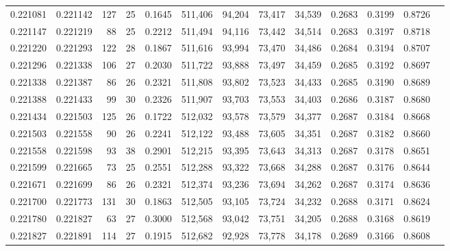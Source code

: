\begin{tabular}{rrrrrrrrrrrrr}
0.221081 & 0.221142 & 127 &  25 &                                     0.1645 & 511,406 &  94,204 &  73,417 &  34,539 & 0.2683 & 0.3199 & 0.8726 \\
0.221147 & 0.221219 &  88 &  25 &                                     0.2212 & 511,494 &  94,116 &  73,442 &  34,514 & 0.2683 & 0.3197 & 0.8718 \\
0.221220 & 0.221293 & 122 &  28 &                                     0.1867 & 511,616 &  93,994 &  73,470 &  34,486 & 0.2684 & 0.3194 & 0.8707 \\
0.221296 & 0.221338 & 106 &  27 &                                     0.2030 & 511,722 &  93,888 &  73,497 &  34,459 & 0.2685 & 0.3192 & 0.8697 \\
0.221338 & 0.221387 &  86 &  26 &                                     0.2321 & 511,808 &  93,802 &  73,523 &  34,433 & 0.2685 & 0.3190 & 0.8689 \\
0.221388 & 0.221433 &  99 &  30 &                                     0.2326 & 511,907 &  93,703 &  73,553 &  34,403 & 0.2686 & 0.3187 & 0.8680 \\
0.221434 & 0.221503 & 125 &  26 &                                     0.1722 & 512,032 &  93,578 &  73,579 &  34,377 & 0.2687 & 0.3184 & 0.8668 \\
0.221503 & 0.221558 &  90 &  26 &                                     0.2241 & 512,122 &  93,488 &  73,605 &  34,351 & 0.2687 & 0.3182 & 0.8660 \\
0.221558 & 0.221598 &  93 &  38 &                                     0.2901 & 512,215 &  93,395 &  73,643 &  34,313 & 0.2687 & 0.3178 & 0.8651 \\
0.221599 & 0.221665 &  73 &  25 &                                     0.2551 & 512,288 &  93,322 &  73,668 &  34,288 & 0.2687 & 0.3176 & 0.8644 \\
0.221671 & 0.221699 &  86 &  26 &                                     0.2321 & 512,374 &  93,236 &  73,694 &  34,262 & 0.2687 & 0.3174 & 0.8636 \\
0.221700 & 0.221773 & 131 &  30 &                                     0.1863 & 512,505 &  93,105 &  73,724 &  34,232 & 0.2688 & 0.3171 & 0.8624 \\
0.221780 & 0.221827 &  63 &  27 &                                     0.3000 & 512,568 &  93,042 &  73,751 &  34,205 & 0.2688 & 0.3168 & 0.8619 \\
0.221827 & 0.221891 & 114 &  27 &                                     0.1915 & 512,682 &  92,928 &  73,778 &  34,178 & 0.2689 & 0.3166 & 0.8608 \\

\end{tabular}
